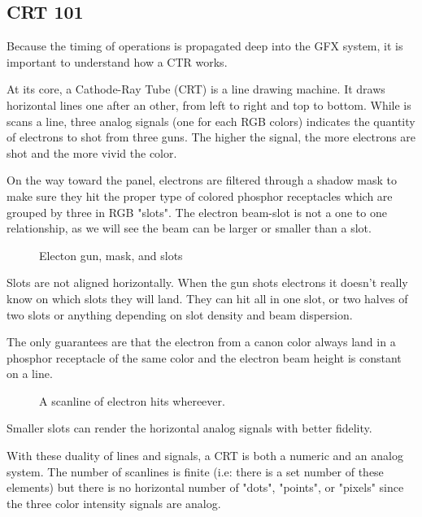 \subsection{CRT 101}

Because the timing of operations is propagated deep into the GFX system, it is important to understand how a CTR works.

At its core, a Cathode-Ray Tube (CRT) is a line drawing machine. It draws horizontal lines one after an other, from left to right and top to bottom. While is scans a line, three analog signals (one for each RGB colors) indicates the quantity of electrons to shot from three guns. The higher the signal, the more electrons are shot and the more vivid the color.


On the way toward the panel, electrons are filtered through a shadow mask to make sure they hit the proper type of colored phosphor receptacles which are grouped by three in RGB "slots". The electron beam-slot is not a one to one relationship, as we will see the beam can be larger or smaller than a slot.





\begin{figure}[H]
\caption*{Electon gun, mask, and slots}
\end{figure}

Slots are not aligned horizontally. When the gun shots electrons it doesn't really know on which slots they will land. They can hit all in one slot, or two halves of two slots or anything depending on slot density and beam dispersion. 

The only guarantees are that the electron from a canon color always land in a phosphor receptacle of the same color and the electron beam height is constant on a line.

\begin{figure}[H]
\caption*{A scanline of electron hits whereever.}
\end{figure}

Smaller slots can render the horizontal analog signals with better fidelity.





 With these duality of lines and signals, a CRT is both a numeric and an analog system. The number of scanlines is finite (i.e: there is a set number of these elements) but there is no horizontal number of "dots", "points", or "pixels" since the three color intensity signals are analog.



